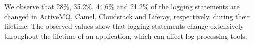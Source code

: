 %


We observe that 28\%, 35.2\%, 44,6\% and 21.2\% of the logging statements are changed in ActiveMQ, Camel, Cloudstack and Liferay, respectively, during their lifetime. The observed values show that logging statements change extensively throughout the lifetime of an application, which can affect log processing tools.



%	
%		




